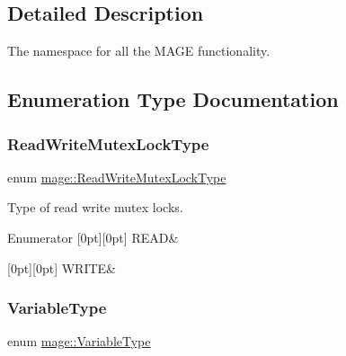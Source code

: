 \subsection{Detailed Description}
The namespace for all the M\+A\+GE functionality. 

\subsection{Enumeration Type Documentation}
\hypertarget{namespacemage_afd76fcca37ce5c5b2227671290973c74}{}\label{namespacemage_afd76fcca37ce5c5b2227671290973c74} 
\subsubsection{\texorpdfstring{Read\+Write\+Mutex\+Lock\+Type}{ReadWriteMutexLockType}}
{\footnotesize\ttfamily enum \hyperlink{namespacemage_afd76fcca37ce5c5b2227671290973c74}{mage\+::\+Read\+Write\+Mutex\+Lock\+Type}}

Type of read write mutex locks. \begin{DoxyEnumFields}{Enumerator}
[0pt][0pt]{}\hypertarget{namespacemage_afd76fcca37ce5c5b2227671290973c74a384918b13691984406aeb754f1c454d0}{}\label{namespacemage_afd76fcca37ce5c5b2227671290973c74a384918b13691984406aeb754f1c454d0} 
R\+E\+AD&\\
\hline

[0pt][0pt]{}\hypertarget{namespacemage_afd76fcca37ce5c5b2227671290973c74aff9d196f4bda4079f3f1ce90bd644662}{}\label{namespacemage_afd76fcca37ce5c5b2227671290973c74aff9d196f4bda4079f3f1ce90bd644662} 
W\+R\+I\+TE&\\
\hline

\end{DoxyEnumFields}
\hypertarget{namespacemage_a530428e73bac0ba7fe84b29086a9e33a}{}\label{namespacemage_a530428e73bac0ba7fe84b29086a9e33a} 
\subsubsection{\texorpdfstring{Variable\+Type}{VariableType}}
{\footnotesize\ttfamily enum \hyperlink{namespacemage_a530428e73bac0ba7fe84b29086a9e33a}{mage\+::\+Variable\+Type}}

